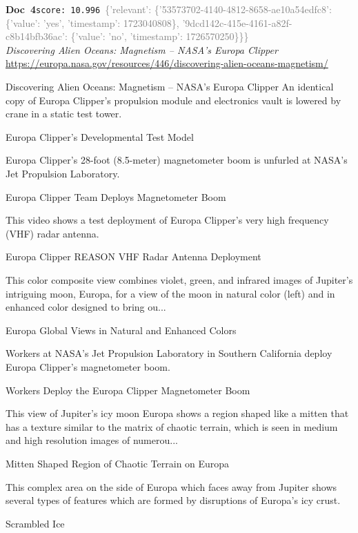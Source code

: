 \documentclass[a4paper,11pt]{article}
\begin{document}
\begin{docenv}
{\footnotesize\textcolor{doccolor}{\textbf{Doc~4}}}\hfill{\tiny\texttt{score:~10.996}}\ {\tiny\textcolor{gray}{\{'relevant': \{'53573702-4140-4812-8658-ae10a54edfc8': \{'value': 'yes', 'timestamp': 1723040808\}, '9dcd142c-415e-4161-a82f-c8b14bfb36ac': \{'value': 'no', 'timestamp': 1726570250\}\}\}}}\\[3pt]
{\small\textit{Discovering Alien Oceans: Magnetism – NASA's Europa Clipper}}\\[2pt]
{\tiny\url{https://europa.nasa.gov/resources/446/discovering-alien-oceans-magnetism/}}\\[4pt]
{\footnotesize Discovering Alien Oceans: Magnetism – NASA's Europa Clipper
An identical copy of Europa Clipper's propulsion module and electronics vault is lowered by crane in a static test tower.

Europa Clipper's Developmental Test Model

Europa Clipper’s 28-foot (8.5-meter) magnetometer boom is unfurled at NASA’s Jet Propulsion Laboratory.

Europa Clipper Team Deploys Magnetometer Boom

This video shows a test deployment of Europa Clipper’s very high frequency (VHF) radar antenna.

Europa Clipper REASON VHF Radar Antenna Deployment

This color composite view combines violet, green, and infrared images of Jupiter's intriguing moon, Europa, for a view of the moon in natural color (left) and in enhanced color designed to bring ou...

Europa Global Views in Natural and Enhanced Colors

Workers at NASA’s Jet Propulsion Laboratory in Southern California deploy Europa Clipper’s magnetometer boom.

Workers Deploy the Europa Clipper Magnetometer Boom

This view of Jupiter's icy moon Europa shows a region shaped like a mitten that has a texture similar to the matrix of chaotic terrain, which is seen in medium and high resolution images of numerou...

 Mitten Shaped Region of Chaotic Terrain on Europa 

This complex area on the side of Europa which faces away from Jupiter shows several types of features which are formed by disruptions of Europa's icy crust.

Scrambled Ice

}
\end{docenv}
\end{document}
